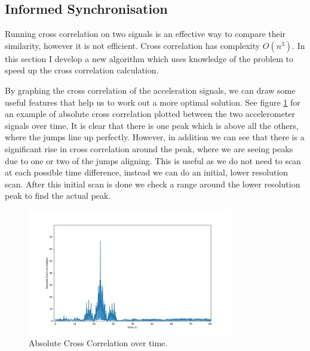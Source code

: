 \documentclass[12pt,a4paper,twoside,openany]{report}
\begin{document}
\subsection{Informed Synchronisation}

Running cross correlation on two signals is an effective way to compare their
similarity, however it is not efficient. Cross correlation has complexity
\(O(n^3)\). In this section I develop a new algorithm which uses knowledge of
the problem to speed up the cross correlation calculation.

By graphing the cross correlation of the acceleration signals, we can draw
some useful features that help us to work out a more optimal solution. See
figure \ref{fig:cross-correlation} for an example of absolute cross correlation plotted
between the two accelerometer signals over time. It is clear that there is one
peak which is above all the others, where the jumps line up perfectly.
However, in addition we can see that there is a significant rise in cross
correlation around the peak, where we are seeing peaks due to one or two of
the jumps aligning. This is useful as we do not need to scan at each
possible time difference, instead we can do an initial, lower resolution scan.
After this initial scan is done we check a range
around the lower resolution peak to find the actual peak.

\begin{figure}[h!]
	\centerline{\includegraphics[width=0.8\textwidth]{figs/cross-correlation.png}}
	\caption{Absolute Cross Correlation over time. }
	\label{fig:cross-correlation}
\end{figure}
\end{document}
